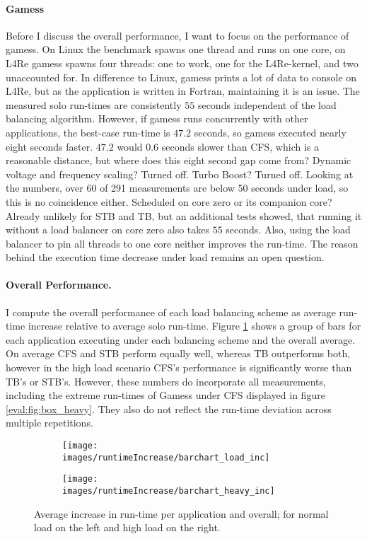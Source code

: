 \paragraph{Gamess}
Before I discuss the overall performance, I want to focus on the performance of
gamess.
On Linux the benchmark spawns one thread and runs on one core, on L4Re gamess
spawns four threads: one to work, one for the L4Re-kernel, and two unaccounted
for.
In difference to Linux, gamess prints a lot of data to console on L4Re, but as
the application is written in Fortran, maintaining it is an issue.
The measured solo run-times are consistently $55$ seconds independent of the
load balancing algorithm.
However, if gamess runs concurrently with other applications, the best-case
run-time is $47.2$ seconds, so gamess executed nearly eight seconds faster.
$47.2$ would $0.6$ seconds slower than CFS, which is a reasonable distance, but
where does this eight second gap come from?
Dynamic voltage and frequency scaling? Turned off.
Turbo Boost? Turned off.
Looking at the numbers, over 60 of 291 measurements are below 50 seconds under
load, so this is no coincidence either.
Scheduled on core zero or its companion core? Already unlikely for STB and TB,
but an additional tests showed, that running it without a load balancer on core
zero also takes $55$ seconds.
Also, using the load balancer to pin all threads to one core neither improves
the run-time.
The reason behind the execution time decrease under load remains an open
question.

\paragraph{Overall Performance.}
I compute the overall performance of each load balancing scheme as average
run-time increase relative to average solo run-time.
Figure \ref{eval:fig:exec_inc} shows a group of bars for each application
executing under each balancing scheme and the overall average.
On average CFS and STB perform equally well, whereas TB outperforms both,
however in the high load scenario CFS's performance is significantly worse
than TB's or STB's.
However, these numbers do incorporate all measurements, including the extreme
run-times of Gamess under CFS displayed in figure \ref{eval:fig:box_heavy}.
They also do not reflect the run-time deviation across multiple repetitions.
%
\begin{figure}[h!]
  \begin{subfigure}{.49\textwidth}
  \texttt{[image: images/runtimeIncrease/barchart\_load\_inc]}
  \end{subfigure}
  \begin{subfigure}{.49\textwidth}
  \texttt{[image: images/runtimeIncrease/barchart\_heavy\_inc]}
  \end{subfigure}
  \caption{Average increase in run-time per application and overall; for
    normal load on the left and high load on the right.}
  \label{eval:fig:exec_inc}
\end{figure}
